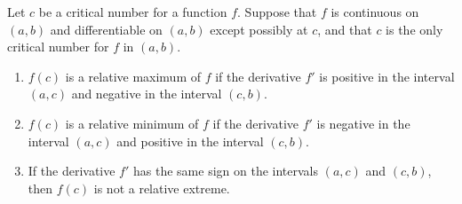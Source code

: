 \documentclass{book}
\begin{document}
\begin{Thm} Let $c$ be a critical number for a function $f$. Suppose that $f$ is continuous on $(a,b)$ and differentiable on $(a,b)$ except possibly at $c$, and that $c$ is the only critical number for $f$ in $(a,b)$.
\begin{enumerate}
\item $f(c)$ is a relative maximum of $f$ if the derivative $f'$ is positive in the interval $(a,c)$ and negative in the interval $(c,b)$.\\

\item $f(c)$ is a relative minimum of $f$ if the derivative $f'$ is negative in the interval $(a,c)$ and positive in the interval $(c,b)$.\\

\item If the derivative $f'$ has the same sign on the intervals $(a,c)$ and $(c,b)$, then $f(c)$ is not a relative extreme.
\end{enumerate}
\end{Thm}\vs
\end{document}
